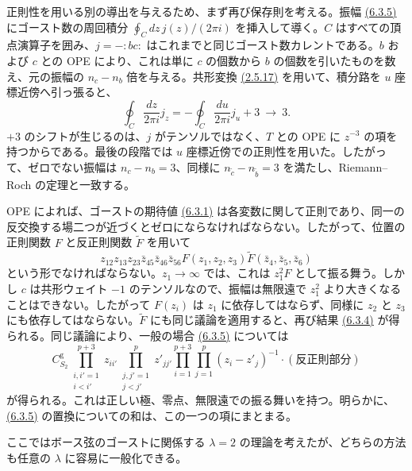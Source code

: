 正則性を用いる別の導出を与えるため、まず再び保存則を考える。振幅 \hyperref[eq:6.3.5]{(6.3.5)} にゴースト数の周回積分 $\oint_C dz\,j(z)/(2\pi i)$ を挿入して導く。$C$ はすべての頂点演算子を囲み、$j=-:bc:$ はこれまでと同じゴースト数カレントである。$b$ および $c$ との OPE により、これは単に $c$ の個数から $b$ の個数を引いたものを数え、元の振幅の $n_c-n_b$ 倍を与える。共形変換 \hyperref[eq:2.5.17]{(2.5.17)} を用いて、積分路を $u$ 座標近傍へ引っ張ると、
\begin{equation}
\oint_C\frac{dz}{2\pi i}j_z=-\oint_C\frac{du}{2\pi i}j_u+3\ \longrightarrow\ 3.
\tag{6.3.6}\label{eq:6.3.6}
\end{equation}
$+3$ のシフトが生じるのは、$j$ がテンソルではなく、$T$ との OPE に $z^{-3}$ の項を持つからである。最後の段階では $u$ 座標近傍での正則性を用いた。したがって、ゼロでない振幅は $n_c-n_b=3$、同様に $n_{\widetilde c}-n_{\widetilde b}=3$ を満たし、Riemann--Roch の定理と一致する。

OPE によれば、ゴーストの期待値 \hyperref[eq:6.3.1]{(6.3.1)} は各変数に関して正則であり、同一の反交換する場二つが近づくとゼロにならなければならない。したがって、位置の正則関数 $F$ と反正則関数 $\widetilde F$ を用いて
\begin{equation}
z_{12}z_{13}z_{23}\bar z_{45}\bar z_{46}\bar z_{56}
F(z_1,z_2,z_3)\widetilde F(\bar z_4,\bar z_5,\bar z_6)
\tag{6.3.7}\label{eq:6.3.7}
\end{equation}
という形でなければならない。$z_1\to\infty$ では、これは $z_1^2F$ として振る舞う。しかし $c$ は共形ウェイト $-1$ のテンソルなので、振幅は無限遠で $z_1^2$ より大きくなることはできない。したがって $F(z_i)$ は $z_1$ に依存してはならず、同様に $z_2$ と $z_3$ にも依存してはならない。$\widetilde F$ にも同じ議論を適用すると、再び結果 \hyperref[eq:6.3.4]{(6.3.4)} が得られる。同じ議論により、一般の場合 \hyperref[eq:6.3.5]{(6.3.5)} については
\begin{equation}
C_{S_2}^{\mathrm g}\prod_{\substack{i,i'=1\\i<i'}}^{p+3}z_{ii'}
\prod_{\substack{j,j'=1\\j<j'}}^p z'_{jj'}
\prod_{i=1}^{p+3}\prod_{j=1}^p(z_i-z'_j)^{-1}\cdot(\text{反正則部分})
\tag{6.3.8}\label{eq:6.3.8}
\end{equation}
が得られる。これは正しい極、零点、無限遠での振る舞いを持つ。明らかに、\hyperref[eq:6.3.5]{(6.3.5)} の置換についての和は、この一つの項にまとまる。

ここではボース弦のゴーストに関係する $\lambda=2$ の理論を考えたが、どちらの方法も任意の $\lambda$ に容易に一般化できる。

